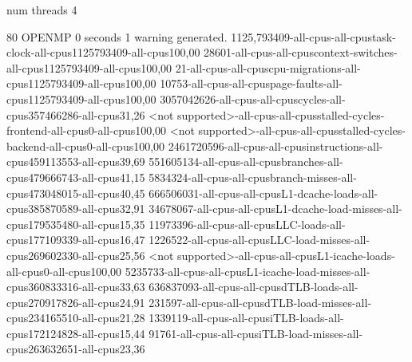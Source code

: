 num threads 4

80
OPENMP
0 seconds
1 warning generated.
1125,793409-all-cpus-all-cpustask-clock-all-cpus1125793409-all-cpus100,00
28601-all-cpus-all-cpuscontext-switches-all-cpus1125793409-all-cpus100,00
21-all-cpus-all-cpuscpu-migrations-all-cpus1125793409-all-cpus100,00
10753-all-cpus-all-cpuspage-faults-all-cpus1125793409-all-cpus100,00
3057042626-all-cpus-all-cpuscycles-all-cpus357466286-all-cpus31,26
<not supported>-all-cpus-all-cpusstalled-cycles-frontend-all-cpus0-all-cpus100,00
<not supported>-all-cpus-all-cpusstalled-cycles-backend-all-cpus0-all-cpus100,00
2461720596-all-cpus-all-cpusinstructions-all-cpus459113553-all-cpus39,69
551605134-all-cpus-all-cpusbranches-all-cpus479666743-all-cpus41,15
5834324-all-cpus-all-cpusbranch-misses-all-cpus473048015-all-cpus40,45
666506031-all-cpus-all-cpusL1-dcache-loads-all-cpus385870589-all-cpus32,91
34678067-all-cpus-all-cpusL1-dcache-load-misses-all-cpus179535480-all-cpus15,35
11973396-all-cpus-all-cpusLLC-loads-all-cpus177109339-all-cpus16,47
1226522-all-cpus-all-cpusLLC-load-misses-all-cpus269602330-all-cpus25,56
<not supported>-all-cpus-all-cpusL1-icache-loads-all-cpus0-all-cpus100,00
5235733-all-cpus-all-cpusL1-icache-load-misses-all-cpus360833316-all-cpus33,63
636837093-all-cpus-all-cpusdTLB-loads-all-cpus270917826-all-cpus24,91
231597-all-cpus-all-cpusdTLB-load-misses-all-cpus234165510-all-cpus21,28
1339119-all-cpus-all-cpusiTLB-loads-all-cpus172124828-all-cpus15,44
91761-all-cpus-all-cpusiTLB-load-misses-all-cpus263632651-all-cpus23,36
